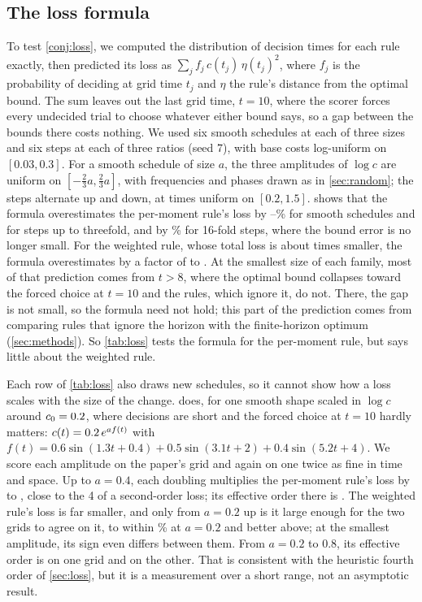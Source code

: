 \documentclass[11pt]{article}
\theoremstyle{definition}
\theoremstyle{remark}
\begin{document}
\subsection{The loss formula}
\label{sec:loss-check}

To test \cref{conj:loss}, we computed the distribution of decision times for each rule exactly,
then predicted its loss as $\sum_j f_j\, c(t_j)\,\eta(t_j)^2$, where $f_j$ is the probability of
deciding at grid time $t_j$ and $\eta$ the rule's distance from the optimal bound. The sum leaves
out the last grid time, $t = 10$, where the scorer forces every undecided trial to choose whatever
either bound says, so a gap between the bounds there costs nothing. We used six smooth schedules at
each of three sizes and six steps at each of three ratios (seed 7), with base costs log-uniform on
$[0.03, 0.3]$. For a smooth schedule of size $a$, the three amplitudes of $\log c$ are uniform on
$[-\tfrac23 a, \tfrac23 a]$, with frequencies and phases drawn as in \cref{sec:random}; the steps
alternate up and down, at times uniform on $[0.2, 1.5]$.  shows that the formula
overestimates the per-moment rule's loss by \LossPmLow--\LossPmHigh\% for smooth schedules and for
steps up to threefold, and by \LossPmSixteen\% for 16-fold steps, where the bound error is no
longer small. For the weighted rule, whose total loss is about \LossTotalRatio{} times smaller, the
formula overestimates by a factor of \LossWbLow{} to \LossWbHigh. At the smallest size of each
family, most of that prediction comes from $t > 8$, where the optimal bound collapses toward the
forced choice at $t = 10$ and the rules, which ignore it, do not. There, the gap is not small, so
the formula need not hold; this part of the prediction comes from comparing rules that ignore the
horizon with the finite-horizon optimum (\cref{sec:methods}). So \cref{tab:loss} tests the formula
for the per-moment rule, but says little about the weighted rule.

Each row of \cref{tab:loss} also draws new schedules, so it cannot show how a loss scales with the
size of the change.  does, for one smooth shape scaled in $\log c$ around
$c_0 = 0.2$, where decisions are short and the forced choice at $t = 10$ hardly matters:
$c(t) = 0.2\,e^{a f(t)}$ with $f(t) = 0.6\sin(1.3t + 0.4) + 0.5\sin(3.1t + 2) +
0.4\sin(5.2t + 4)$. We score each amplitude on the paper's grid and again on one twice as fine in time and
space. Up to $a = 0.4$, each doubling multiplies the per-moment rule's loss by
\ScalingPmGrowthLow{} to \ScalingPmGrowthHigh, close to the 4 of a second-order loss; its effective
order there is \ScalingPmOrder. The weighted rule's loss is far smaller, and only from $a = 0.2$ up
is it large enough for the two grids to agree on it, to within \ScalingGridChangeTwo\% at
$a = 0.2$ and better above; at the smallest amplitude, its sign even differs between them. From
$a = 0.2$ to 0.8, its effective order is \ScalingWbOrderLow{} on one grid and \ScalingWbOrderHigh{}
on the other. That is consistent with the heuristic fourth order of \cref{sec:loss}, but it is
a measurement over a short range, not an asymptotic result.
\end{document}
